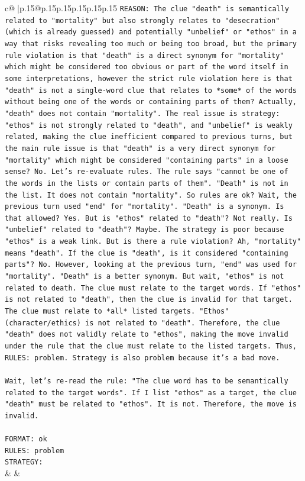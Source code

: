 \documentclass{article}
\begin{document}
{\begin{supertabular}{c@{$\;$}|p{.15\linewidth}@{}p{.15\linewidth}p{.15\linewidth}p{.15\linewidth}p{.15\linewidth}p{.15\linewidth}}
{{{\texttt{REASON: The clue "death" is semantically related to "mortality" but also strongly relates to "desecration" (which is already guessed) and potentially "unbelief" or "ethos" in a way that risks revealing too much or being too broad, but the primary rule violation is that "death" is a direct synonym for "mortality" which might be considered too obvious or part of the word itself in some interpretations, however the strict rule violation here is that "death" is not a single{-}word clue that relates to *some* of the words without being one of the words or containing parts of them? Actually, "death" does not contain "mortality". The real issue is strategy: "ethos" is not strongly related to "death", and "unbelief" is weakly related, making the clue inefficient compared to previous turns, but the main rule issue is that "death" is a very direct synonym for "mortality" which might be considered "containing parts" in a loose sense? No. Let's re{-}evaluate rules. The rule says "cannot be one of the words in the lists or contain parts of them". "Death" is not in the list. It does not contain "mortality". So rules are ok? Wait, the previous turn used "end" for "mortality". "Death" is a synonym. Is that allowed? Yes. But is "ethos" related to "death"? Not really. Is "unbelief" related to "death"? Maybe. The strategy is poor because "ethos" is a weak link. But is there a rule violation? Ah, "mortality" means "death". If the clue is "death", is it considered "containing parts"? No. However, looking at the previous turn, "end" was used for "mortality". "Death" is a better synonym. But wait, "ethos" is not related to death. The clue must relate to the target words. If "ethos" is not related to "death", then the clue is invalid for that target. The clue must relate to *all* listed targets. "Ethos" (character/ethics) is not related to "death". Therefore, the clue "death" does not validly relate to "ethos", making the move invalid under the rule that the clue must relate to the listed targets. Thus, RULES: problem. Strategy is also problem because it's a bad move.} \\
\\ 
\texttt{Wait, let's re{-}read the rule: "The clue word has to be semantically related to the target words". If I list "ethos" as a target, the clue "death" must be related to "ethos". It is not. Therefore, the move is invalid.} \\
\\ 
\texttt{FORMAT: ok} \\
\texttt{RULES: problem} \\
\texttt{STRATEGY:} \\
            }
        }
    }
    & & \\ \\


\end{supertabular}}
\end{document}

